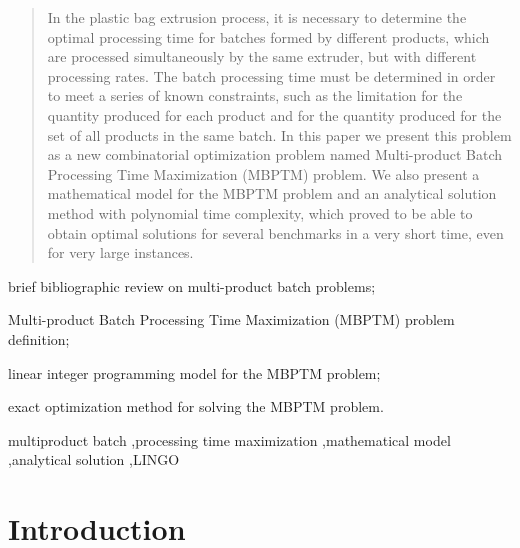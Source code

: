 \documentclass[authoryear,manuscript,12pt]{elsarticle}
\begin{document}
\begin{frontmatter}
\begin{abstract}
In the plastic bag extrusion process, it is necessary to determine the optimal processing time for batches formed by different products, which are processed simultaneously by the same extruder, but with different processing rates. The batch processing time must be determined in order to meet a series of known constraints, such as the limitation for the quantity produced for each product and for the quantity produced for the set of all products in the same batch. In this paper we present this problem as a new combinatorial optimization problem named Multi-product Batch Processing Time Maximization (MBPTM) problem. We also present a mathematical model for the MBPTM problem and an analytical solution method with polynomial time complexity, which proved to be able to obtain optimal solutions for several benchmarks in a very short time, even for very large instances.
\end{abstract}

\begin{highlights}
\item brief bibliographic review on multi-product batch problems;
\item Multi-product Batch Processing Time Maximization (MBPTM) problem definition;
\item linear integer programming model for the MBPTM problem;
\item exact optimization method for solving the MBPTM problem.
\end{highlights}

\begin{keyword}
multiproduct batch \sep processing time maximization \sep mathematical model \sep analytical solution \sep LINGO
\end{keyword}
\end{frontmatter}


\section{Introduction}
\label{sec:intro}
\end{document}
